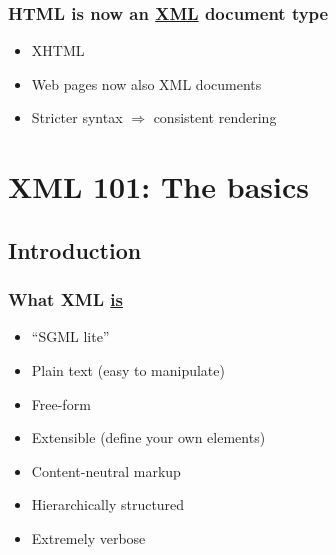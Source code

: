 

\frame
{
	\frametitle{HTML is now an \uline{XML} document type}
	
	\begin{itemize}
	
		\item XHTML
		
		\item Web pages now also XML documents
		
		
		\item Stricter syntax \(\Rightarrow\) consistent rendering
	
	\end{itemize}

}




\section{XML 101: The basics}




\subsection*{Introduction}





\frame
{
	\frametitle{What XML \uline{is}}
	
	\begin{itemize}
	
		\item ``SGML lite''
	
		\item Plain text (easy to manipulate)
		
		\item Free-form
		
		\item Extensible (define your own elements)
		
		\item Content-neutral markup
		
		\item Hierarchically structured
		
		\item Extremely verbose
		
	
	\end{itemize}
}

